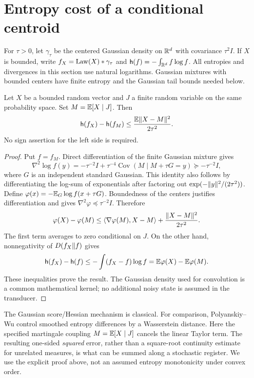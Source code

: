 \section{Entropy cost of a conditional centroid}\label{sec:entropy}
For $\tau>0$, let $\gamma_\tau$ be the centered Gaussian density on
$\mathbb R^d$ with covariance $\tau^2 I$. If $X$ is bounded, write
$f_X=\operatorname{Law}(X)*\gamma_\tau$ and
$\mathsf h(f)=-\int_{\mathbb R^d}f\log f$. All entropies and divergences in this
section use natural logarithms. Gaussian mixtures with bounded centers
have finite entropy and the Gaussian tail bounds needed below.

\begin{lemma}
\label{lem:centroid-entropy}
Let $X$ be a bounded random vector and $J$ a finite random variable on
the same probability space. Set $M=\mathbb E[X\mid J]$. Then
\begin{equation}\label{eq:centroid-entropy}
 \mathsf h(f_X)-\mathsf h(f_M)
       \le\frac{\mathbb E\lVert X-M\rVert^2}{2\tau^2}.
\end{equation}
No sign assertion for the left side is required.
\end{lemma}
\begin{proof}
Put $f=f_M$. Direct differentiation of the finite Gaussian mixture gives
\begin{equation}\label{eq:log-hessian}
 \nabla^2\log f(y)
 =-\tau^{-2}I+\tau^{-4}\operatorname{Cov}(M\mid M+\tau G=y)
 \succeq-\tau^{-2}I,
\end{equation}
where $G$ is an independent standard Gaussian. This identity also follows
by differentiating the log-sum of exponentials after factoring out
$\exp(-\lVert y\rVert^2/(2\tau^2))$.
Define $\varphi(x)=-\mathbb E_G\log f(x+\tau G)$. Boundedness of the centers
justifies differentiation and gives
$\nabla^2\varphi\preceq\tau^{-2}I$. Therefore
\[
 \varphi(X)-\varphi(M)
 \le \langle\nabla\varphi(M),X-M\rangle
           +\frac{\lVert X-M\rVert^2}{2\tau^2}.
\]
The first term averages to zero conditional on $J$. On the other hand,
nonnegativity of $D(f_X\Vert f)$ gives
\[
 \mathsf h(f_X)-\mathsf h(f)
 \le -\int(f_X-f)\log f
 =\mathbb E\varphi(X)-\mathbb E\varphi(M).
\]
These inequalities prove the result. The Gaussian density used for
convolution is a common mathematical kernel; no additional noisy state
is assumed in the transducer.
\end{proof}

The Gaussian score/Hessian mechanism is classical. For comparison,
Polyanskiy--Wu \cite[Proposition 1 and Corollary 4]{PW} control smoothed
entropy differences by a Wasserstein distance. Here the specified
martingale coupling $M=\mathbb E[X\mid J]$ cancels the linear Taylor term.
The resulting one-sided \emph{squared} error, rather than a square-root
continuity estimate for unrelated measures, is what can be summed along
a stochastic register. We use the explicit proof above, not an assumed
entropy monotonicity under convex order.

